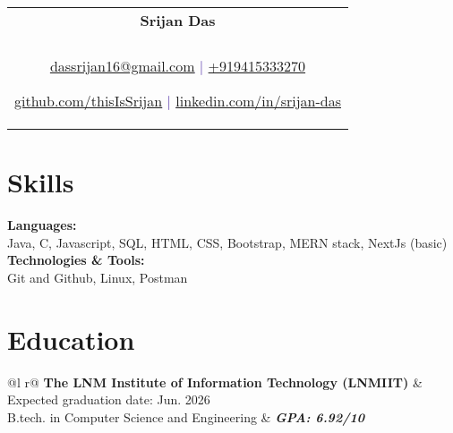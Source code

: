 \documentclass[a4paper,8pt]{article}
\begin{document}
\pagestyle{empty} 


\begin{tabularx}{\linewidth}{@{} C @{}}
\color[HTML]{318CE7} \Huge{\textbf{Srijan Das}} \\[6pt]
\\
\textcolor[HTML]{4B28A4}{\underline{\href{mailto:dassrijan16@gmail.com}{\raisebox{-0.05\height}{\faEnvelope} dassrijan16@gmail.com}} $|$}
\textcolor[HTML]{4B28A4}{\href{tel:+919415333270}{\raisebox{-0.05\height}{\faMobile} +919415333270}}

\textcolor[HTML]{4B28A4}{\underline{\href{https://github.com/thisIsSrijan}{\raisebox{-0.05\height}{\faGithub} github.com/thisIsSrijan}} $|$}
\textcolor[HTML]{4B28A4}{\underline{\href{https://www.linkedin.com/in/srijan-das-04675224b}{\raisebox{-0.05\height}{\faLinkedin} linkedin.com/in/srijan-das}}}
\end{tabularx}

\color[HTML]{318CE7}\section{\textbf{Skills}}
\color[HTML]{1C033C}\textbf{Languages:} \\[2pt]
\color[HTML]{1C033C} \hspace*{4ex} Java, C, Javascript, SQL, HTML, CSS, Bootstrap, MERN stack, NextJs (basic)\\[3pt]
\color[HTML]{1C033C}\textbf{Technologies \& Tools:} \\[2pt]
\color[HTML]{1C033C} \hspace*{4ex} Git and Github, Linux, Postman\\[3pt]


\color[HTML]{318CE7}\section{\textbf{Education}}
\begin{tabularx}{\linewidth}{ @{}l r@{} }
\color[HTML]{1C033C} \textbf{The LNM Institute of Information Technology (LNMIIT)} & \hfill \color[HTML]{1C033C} Expected graduation date: Jun. 2026 \\
\color[HTML]{1C033C} B.tech. in Computer Science and Engineering   & \hfill \color[HTML]{4B28A4} \textit{\textbf{GPA: 6.92/10}} \\
\end{tabularx}
\end{document}
